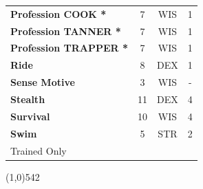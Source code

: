 \documentclass[letterpaper]{article}
\newcommand{\fullline}{\noindent\line(1,0){542} \\}
\begin{document}
\begin{table}[h!]
{{\begin{tabular}{l  c  c  c}
        \textbf{Profession {\scriptsize COOK} *} & 7 & {\footnotesize WIS} & 1 \\
        \textbf{Profession {\scriptsize TANNER} *} & 7 & {\footnotesize WIS} & 1 \\
        \textbf{Profession {\scriptsize TRAPPER} *} & 7 & {\footnotesize WIS} & 1 \\
        \textbf{Ride} & 8 & {\footnotesize DEX} & 1 \\
        \textbf{Sense Motive} & 3 & {\footnotesize WIS} & - \\
        \textbf{Stealth} & 11 & {\footnotesize DEX} & 4 \\
        \textbf{Survival} & 10 & {\footnotesize WIS} & 4 \\
        \textbf{Swim} & 5 & {\footnotesize STR} & 2 \\
        {\footnotesize * Trained Only} \\
        \end{tabular}
    }
}
\vspace{-1.5em}
\end{table} \par

\vspace{-1.5em}
\fullline
\vspace{-1em}
\end{document}
